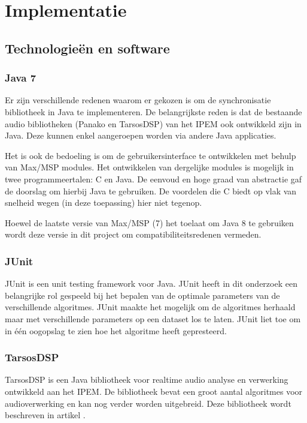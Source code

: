 \chapter{Implementatie}

\section{Technologieën en software}

\subsection{Java 7}

Er zijn verschillende redenen waarom er gekozen is om de synchronisatie bibliotheek in Java te implementeren. De belangrijkste reden is dat de bestaande audio bibliotheken (Panako en TarsosDSP) van het IPEM ook ontwikkeld zijn in Java. Deze kunnen enkel aangeroepen worden via andere Java applicaties.

Het is ook de bedoeling is om de gebruikersinterface te ontwikkelen met behulp van Max/MSP modules. Het ontwikkelen van dergelijke modules is mogelijk in twee programmeertalen: C en Java. De eenvoud en hoge graad van abstractie gaf de doorslag om hierbij Java te gebruiken. De voordelen die C biedt op vlak van snelheid wegen (in deze toepassing) hier niet tegenop.

Hoewel de laatste versie van Max/MSP (7) het toelaat om Java 8 te gebruiken wordt deze versie in dit project om compatibiliteitsredenen vermeden. 

\subsection{JUnit}
JUnit is een unit testing framework voor Java. JUnit heeft in dit onderzoek een belangrijke rol gespeeld bij het bepalen van de optimale parameters van de verschillende algoritmes. JUnit maakte het mogelijk om de algoritmes herhaald maar met verschillende parameters op een dataset los te laten. JUnit liet toe om in één oogopslag te zien hoe het algoritme heeft gepresteerd.

\subsection{TarsosDSP}
\label{tarsos}

TarsosDSP is een Java bibliotheek voor realtime audio analyse en verwerking ontwikkeld aan het IPEM. De bibliotheek bevat een groot aantal algoritmes voor audioverwerking en kan nog verder worden uitgebreid. Deze bibliotheek wordt beschreven in artikel \cite{six2014tarsosdsp}. 


